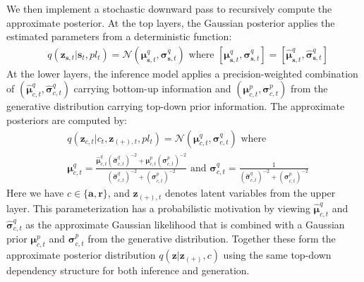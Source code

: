 \documentclass{article}
\newcommand{\context}{c}
\newcommand{\latentvariables}{\mathbf{z}}
\newcommand{\state}{\mathbf{s}}
\newcommand{\action}{\mathbf{a}}
\newcommand{\reward}{\boldsymbol{r}}
\newcommand{\player}{pl}
\begin{document}
We then implement a stochastic downward pass to recursively compute the
approximate posterior. At the top layers, the Gaussian posterior applies the estimated parameters from a deterministic function:
\begin{align}
    &q(\latentvariables_{\state,t}|\state_{t},\player_{t})=\mathcal{N}(\boldsymbol{\mu}^{q}_{\state,t},\boldsymbol{\sigma}^{q}_{\state,t}) \text{ where }[\boldsymbol{\mu}^{q}_{\state,t},\boldsymbol{\sigma}^{q}_{\state,t}]=[\boldsymbol{\hat{\mu}}^{q}_{\state,t},\boldsymbol{\hat{\sigma}}^{q}_{\state,t}]
\end{align}
At the lower layers, the inference model applies a precision-weighted combination of
$(\boldsymbol{\hat{\mu}}^{q}_{\context,t}, \boldsymbol{\hat{\sigma}}^{q}_{\context,t})$
carrying bottom-up information and $(\boldsymbol{\mu}^{p}_{\context,t}, \boldsymbol{\sigma}^{p}_{\context,t})$
from the generative distribution carrying
top-down prior information. The approximate posteriors are computed by:
\begin{align}
    &q(\latentvariables_{\context,t}|\context_{t},\latentvariables_{(+),t}, \player_{t})=\mathcal{N}(\boldsymbol{\mu}^{q}_{\context,t},\boldsymbol{\sigma}^{q}_{\context,t}) \text{ where } \\
    &\boldsymbol{\mu}^{q}_{\context,t} = \frac{\boldsymbol{\hat{\mu}}^{q}_{\context,t}(\boldsymbol{\hat{\sigma}}^{q}_{\context,t})^{-2}+\boldsymbol{\mu}^{p}_{\context,t}(\boldsymbol{\sigma}^{p}_{\context,t})^{-2}}{(\boldsymbol{\hat{\sigma}}^{q}_{\context,t})^{-2}+(\boldsymbol{\sigma}^{p}_{\context,t})^{-2}} \text{ and } 
    \boldsymbol{\sigma}^{q}_{\context,t}=\frac{1}{(\boldsymbol{\hat{\sigma}}^{q}_{\context,t})^{-2}+(\boldsymbol{\sigma}^{p}_{\context,t})^{-2}}\nonumber
\end{align}
Here we have $\context\in\{\action,\reward\}$, and $\latentvariables_{(+),t}$ denotes latent variables from the upper layer. This parameterization has a probabilistic motivation by viewing $\boldsymbol{\hat{\mu}}^{q}_{\context,t}$ and $\boldsymbol{\hat{\sigma}}^{q}_{\context,t}$
as the approximate Gaussian likelihood that is combined with a Gaussian prior $\boldsymbol{\mu}^{p}_{\context,t}$ and $\boldsymbol{\sigma}^{p}_{\context,t}$
from the generative distribution. Together these form the approximate posterior distribution $q(\latentvariables|\latentvariables_{(+)}, \context)$ using the same top-down dependency structure for both inference and generation.
\end{document}
